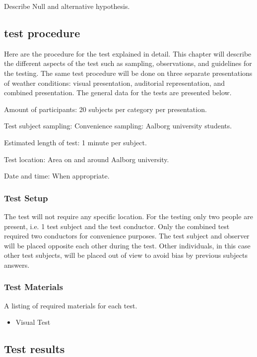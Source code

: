 Describe Null and alternative hypothesis.

\subsection{test procedure}

Here are the procedure for the test explained in detail. This chapter will describe the different aspects of the test such as sampling, observations, and guidelines for the testing. The same test procedure will be done on three separate presentations of weather conditions: visual presentation, auditorial representation, and combined presentation.
The general data for the tests are presented below.

Amount of participants: 20 subjects per category per presentation.


Test subject sampling: Convenience sampling: Aalborg university students.


Estimated length of test: 1 minute per subject.


Test location: Area on and around Aalborg university.


Date and time: When appropriate.

\subsubsection{Test Setup}
The test will not require any specific location. 
For the testing only two people are present, i.e. 1 test subject and the test conductor. Only the combined test required two conductors for convenience purposes. The test subject and observer will be placed opposite each other during the test.
Other individuals, in this case other test subjects, will be placed out of view to avoid bias by previous subjects answers.

\subsubsection{Test Materials}
A listing of required materials for each test.
\begin{itemize}
\item Visual Test

\end{itemize}

\subsection{Test results}

